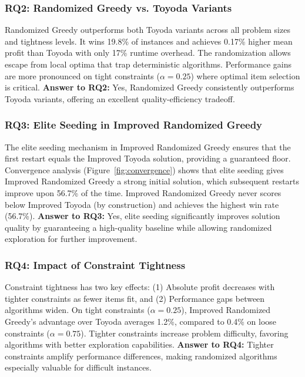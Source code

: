 \documentclass[12pt,a4paper]{article}
\begin{document}
\subsubsection{RQ2: Randomized Greedy vs. Toyoda Variants}

Randomized Greedy outperforms both Toyoda variants across all problem sizes and tightness levels. It wins 19.8\% of instances and achieves 0.17\% higher mean profit than Toyoda with only 17\% runtime overhead. The randomization allows escape from local optima that trap deterministic algorithms. Performance gains are more pronounced on tight constraints ($\alpha = 0.25$) where optimal item selection is critical. \textbf{Answer to RQ2:} Yes, Randomized Greedy consistently outperforms Toyoda variants, offering an excellent quality-efficiency tradeoff.

\subsubsection{RQ3: Elite Seeding in Improved Randomized Greedy}

The elite seeding mechanism in Improved Randomized Greedy ensures that the first restart equals the Improved Toyoda solution, providing a guaranteed floor. Convergence analysis (Figure~\ref{fig:convergence}) shows that elite seeding gives Improved Randomized Greedy a strong initial solution, which subsequent restarts improve upon 56.7\% of the time. Improved Randomized Greedy never scores below Improved Toyoda (by construction) and achieves the highest win rate (56.7\%). \textbf{Answer to RQ3:} Yes, elite seeding significantly improves solution quality by guaranteeing a high-quality baseline while allowing randomized exploration for further improvement.

\subsubsection{RQ4: Impact of Constraint Tightness}

Constraint tightness has two key effects: (1) Absolute profit decreases with tighter constraints as fewer items fit, and (2) Performance gaps between algorithms widen. On tight constraints ($\alpha = 0.25$), Improved Randomized Greedy's advantage over Toyoda averages 1.2\%, compared to 0.4\% on loose constraints ($\alpha = 0.75$). Tighter constraints increase problem difficulty, favoring algorithms with better exploration capabilities. \textbf{Answer to RQ4:} Tighter constraints amplify performance differences, making randomized algorithms especially valuable for difficult instances.
\end{document}
